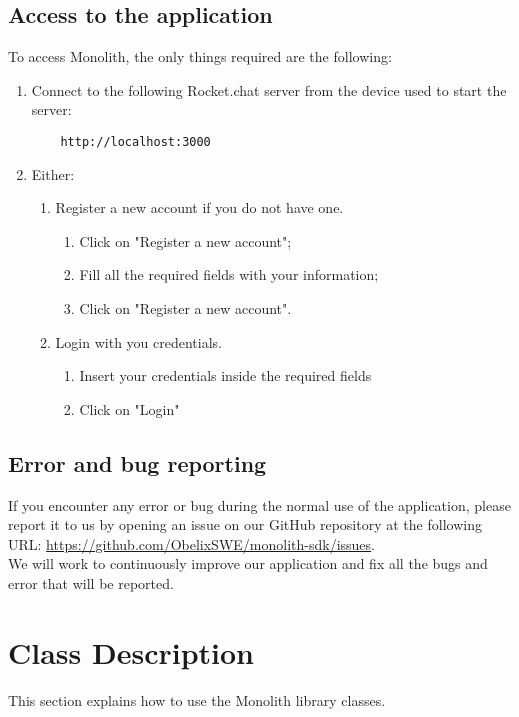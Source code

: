 \subsection{Access to the application}
To access Monolith, the only things required are the following:
\begin{enumerate}
	\item Connect to the following Rocket.chat server from the device used to start the server:
	\begin{lstlisting}
	http://localhost:3000
	\end{lstlisting}
	\item Either:
	\begin{enumerate}
		\item Register a new account if you do not have one.
		\begin{enumerate}
			\item Click on "Register a new account";
			\item Fill all the required fields with your information;
			\item Click on "Register a new account".
		\end{enumerate}
		
		\item Login with you credentials.
		\begin{enumerate}
			\item Insert your credentials inside the required fields
			\item Click on "Login"
		\end{enumerate}
	\end{enumerate}
\end{enumerate}

\subsection{Error and bug reporting}
If you encounter any error or bug during the normal use of the application, please report it to us by opening an issue on our GitHub repository at the following URL: \url{https://github.com/ObelixSWE/monolith-sdk/issues}. \\
We will work to continuously improve our application and fix all the bugs and error that will be reported. 

\section{Class Description}
This section explains how to use the Monolith library classes.

